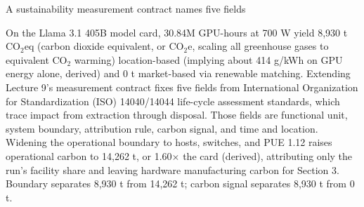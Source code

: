 \documentclass[aspectratio=169, 12pt]{beamer}
\begin{document}
\begin{frame}{A sustainability measurement contract names five fields}
{  On the Llama 3.1 405B model card, 30.84M GPU-hours at 700 W yield 8,930 t $\text{CO}_2$eq (carbon dioxide equivalent, or $\text{CO}_2$e, scaling all greenhouse gases to equivalent $\text{CO}_2$ warming) location-based (implying about 414 g/kWh on GPU energy alone, derived) and 0 t market-based via renewable matching. Extending Lecture 9's measurement contract fixes five fields from International Organization for Standardization (ISO) 14040/14044 life-cycle assessment standards, which trace impact from extraction through disposal. Those fields are functional unit, system boundary, attribution rule, carbon signal, and time and location. Widening the operational boundary to hosts, switches, and PUE 1.12 raises operational carbon to 14,262 t, or 1.60$\times$ the card (derived), attributing only the run's facility share and leaving hardware manufacturing carbon for Section 3. Boundary separates 8,930 t from 14,262 t; carbon signal separates 8,930 t from 0 t.


}
\end{frame}
\end{document}
